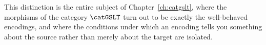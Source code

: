 This distinction is the entire subject of Chapter~\ref{ch:catgslt}, where the
morphisms of the category $\catGSLT$ turn out to be exactly the well-behaved encodings, and
where the conditions under which an encoding tells you something about the source rather
than merely about the target are isolated.

